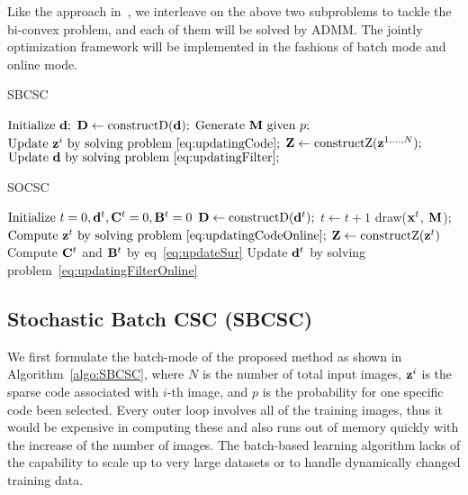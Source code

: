 Like the approach in~\cite{heide2015fast}, we interleave on the above two subproblems to tackle the bi-convex problem, and each of them will be solved by ADMM. The jointly optimization framework will be implemented in the fashions of batch mode and online mode.

\begin{minipage}[t]{0.5\textwidth}
\vspace{0pt}
\begin{algorithm}[H]
\caption{SBCSC} \label{algo:SBCSC}
\begin{algorithmic}[1]
\State $\text{Initialize} ~ \filter;$
    \State $\Filter \gets \text{constructD}(\filter);$
        \State $ \text{Generate } \mask \text{ given } p;$
        \State $ \text{Update } \code^i \text{ by solving problem~\ref{eq:updatingCode}};$
    \EndFor
    \State $\Code \gets \text{constructZ}(\code^{1,...,N});$
    \State $\text{Update } \filter \text{ by solving problem~\ref{eq:updatingFilter}} ;$
\EndWhile
\end{algorithmic}
\end{algorithm}
\end{minipage}
\begin{minipage}[t]{0.5\textwidth}
\vspace{0pt}
\begin{algorithm}[H]
\caption{SOCSC} \label{algo:SOCSC}
\begin{algorithmic}[1]
\State $\text{Initialize} ~ t=0, \filter^t,  \surC^t = 0, \surB^t = 0$
    \State $\Filter \gets \text{constructD}(\filter^t);$
    \State $t \gets t+1$
    \State draw($\signal^t$, $\mask$);
    \State $ \text{Compute } \code^t \text{ by solving problem~\ref{eq:updatingCodeOnline}};$
    \State $\Code \gets \text{constructZ}(\code^t)$
    \State Compute $\surC^t$ and $\surB^t$ by eq~\ref{eq:updateSur}
    \State Update $\filter^t$ by solving problem~\ref{eq:updatingFilterOnline}
\EndWhile
\end{algorithmic}
\end{algorithm}
\end{minipage}

\subsection{Stochastic Batch CSC (SBCSC)}
We first formulate the batch-mode of the proposed method as shown in Algorithm~\ref{algo:SBCSC}, where $N$ is the number of total input images, $\code^i$ is the sparse code associated with $i$-th image, and $p$ is the probability for one specific code been selected. Every outer loop involves all of the training images, thus it would be expensive in computing these and also runs out of memory quickly with the increase of the number of images. The batch-based learning algorithm lacks of the capability to scale up to very large datasets or to handle dynamically changed training data.

